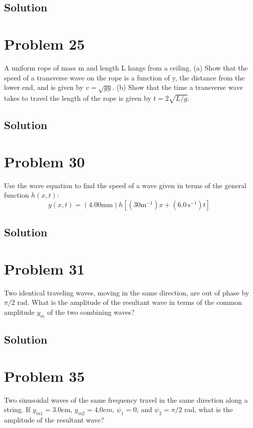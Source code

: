 \documentclass[12pt]{article}
\begin{document}
        \subsection{Solution}

    \section{Problem 25}
        A uniform rope of mass m and length L hangs from a ceiling. 
        (a) Show that the speed of a transverse wave on the rope is a function of y, the distance from the lower end, and is given by $v = \sqrt{gy}$.
        (b) Show that the time a transverse wave takes to travel the length of the rope is given by $t = 2\sqrt{L/g}$.

        \subsection{Solution}

    \section{Problem 30}
        Use the wave equation to find the speed of a wave given in terms of the general function $h(x, t)$:
        \begin{equation}
            y(x, t) = (4.00 \unit{\milli\meter}) h[(30 \unit{\meter^{-1}})x + (6.0\,\unit{\second^{-1}})t]
        \end{equation}

        \subsection{Solution}

    \section{Problem 31}
        Two identical traveling waves, moving in the same direction, are out of phase by $\pi/2$ rad. 
        What is the amplitude of the resultant wave in terms of the common amplitude $y_m$ of the two combining waves?

        \subsection{Solution}

    \section{Problem 35}
        Two sinusoidal waves of the same frequency travel in the same direction along a string. 
        If $y_{m1} = 3.0 \unit{\centi\meter}$, $y_{m2} = 4.0 cm$, $\psi_1 = 0$, and $\psi_2 = \pi/2$ rad, what is the amplitude of the resultant wave?
\end{document}
